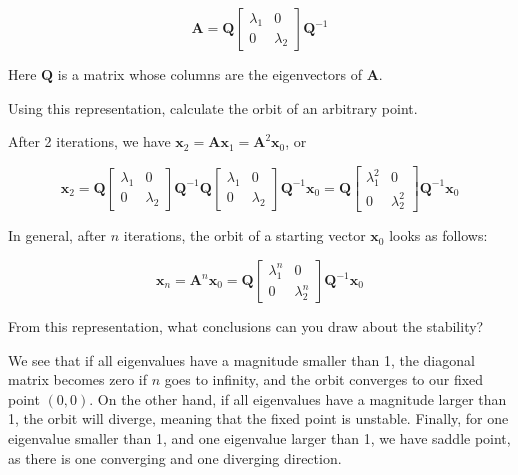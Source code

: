 \begin{equation}
{\mathbf A} = {\mathbf Q}
\begin{bmatrix}
\lambda_{1} & 0 \\
0 & \lambda_{2}
\end{bmatrix} 
{\mathbf Q^{-1}}
\end{equation} 

Here $\mathbf Q$ is a matrix whose columns are the eigenvectors of ${\mathbf A}$. 

\begin{cue}
Using this representation, calculate the orbit of an arbitrary point.
\end{cue}

After 2 iterations, we have $ {\mathbf x}_2 = {\mathbf A} {\mathbf x}_1 = {\mathbf A}^2 {\mathbf x}_0$, or

\begin{equation}
    {\mathbf x}_2 =  {\mathbf Q}
    \begin{bmatrix}
    \lambda_1 & 0 \\
    0 & \lambda_2
    \end{bmatrix} 
    {\mathbf Q^{-1}} {\mathbf Q}
    \begin{bmatrix}
    \lambda_1 & 0 \\
    0 & \lambda_2
    \end{bmatrix} 
    {\mathbf Q^{-1}} {\mathbf x}_0 =  {\mathbf Q}
    \begin{bmatrix}
    \lambda_1^2 & 0 \\
    0 & \lambda_2^2
    \end{bmatrix} 
    {\mathbf Q^{-1}} {\mathbf x}_0
\end{equation} 

In general, after $n$ iterations, the orbit of a starting vector ${\mathbf x}_0$ looks as follows:

\begin{equation}
{\mathbf x}_n = {\mathbf A}^n {\mathbf x}_0 = {\mathbf Q}
\begin{bmatrix}
\lambda_1^n & 0 \\
0 & \lambda_2^n
\end{bmatrix} 
{\mathbf Q^{-1}} {\mathbf x}_0 
\end{equation} 

\begin{cue}
From this representation, what conclusions can you draw about the stability?  
\end{cue}

We see that if all eigenvalues have a magnitude smaller than 1, the diagonal matrix becomes zero if $n$ goes to infinity, and the orbit converges to our fixed point $(0,0)$. On the other hand, if all eigenvalues have a magnitude larger than 1, the orbit will diverge, meaning that the fixed point is unstable. Finally, for one eigenvalue smaller than 1, and one eigenvalue larger than 1, we have saddle point, as there is one converging and one diverging direction.


